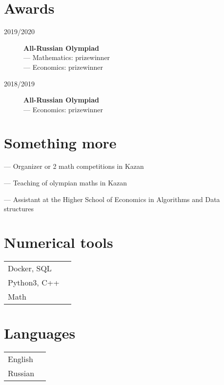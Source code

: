 \documentclass[a4paper,10pt]{article}
\begin{document}
\begin{adjustbox}{valign=t}
\begin{minipage}{0.6\textwidth}
\section*{Awards}
\begin{description}
\item[\normalfont \textcolor{ColorOne}{2019/2020}] 
    \textbf{All-Russian Olympiad  }\\
	--- Mathematics: prizewinner\\
	--- Economics: prizewinner
\item[\normalfont \textcolor{ColorOne}{2018/2019}] 
    \textbf{All-Russian Olympiad  }\\
	--- Economics: prizewinner

\end{description}
\section*{Something more}
\begin{description}
	\raggedright
	\item --- Organizer or 2 math competitions in Kazan \\
	\item --- Teaching of olympian maths in Kazan  \\
	\item --- Assistant at the Higher School of Economics in Algorithms and Data structures
\end{description}
\MySkip
\begin{multicols}{2}
\section*{Numerical tools}
\begin{tabular}{ll}
	Docker, SQL  			& \SkillBull{$\bullet \bullet \circ \, \circ$}\\
	Python3, C++  		& \SkillBull{$\bullet \bullet \bullet \, \circ $}\\
	Math 	& \SkillBull{$\bullet \bullet \bullet \, \bullet$}\\
\end{tabular}

\vfill\null \columnbreak  %

\section*{Languages}
\begin{tabular}{ll}
	English 		& \SkillBull{$\bullet \circ \circ \, \circ$}\\
	Russian 		& \SkillBull{$\bullet \bullet \bullet \,\bullet$}\\
\end{tabular}
\end{multicols}
\LastUpdate
\end{minipage}
\end{adjustbox}
\end{document}
